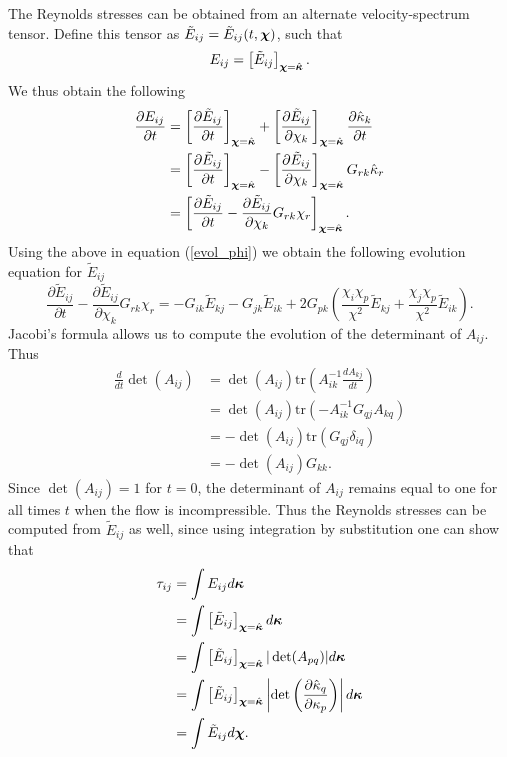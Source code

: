 \documentclass[oneside,a4paper,11pt]{report}
\newcommand{\rs}{\tau}          %
\newcommand{\est}{E}            %
\begin{document}
The Reynolds stresses can be obtained from an alternate velocity-spectrum tensor. Define this tensor as $\tilde{\est}_{ij} = \tilde{\est}_{ij}(t,\chivec)$, such that
\begin{equation}
\est_{ij} = \left [ \tilde{\est}_{ij} \right ]_{\chivec = \hat{\kvec}}.
\end{equation}
We thus obtain the following
\begin{align}
\frac{\partial{\est_{ij}}}{\partial t} &= \left [ \frac{ \partial \tilde{\est}_{ij} }{\partial t} \right ]_{\chivec = \hat{\kvec}} + \left [ \frac{\partial \tilde{\est}_{ij} }{\partial \chi_k} \right ]_{\chivec = \hat{\kvec} } \frac{\partial \hat{\kappa}_k }{\partial t} \nonumber \\
& = \left [ \frac{\partial \tilde{\est}_{ij} }{\partial t} \right ]_{\chivec = \hat{\kvec} } - \left [ \frac{\partial \tilde{\est}_{ij} }{\partial \chi_k} \right ]_{\chivec = \hat{\kvec} } G_{rk} \hat{\kappa}_r \nonumber \\
& = \left [ \frac{\partial \tilde{\est}_{ij}}{\partial t} - \frac{\partial \tilde{\est}_{ij}}{\partial \chi_k} G_{rk}\chi_r \right ]_{\chivec = \hat{\kvec} }.
\end{align}
Using the above in equation (\ref{evol_phi}) we obtain the following evolution equation for $\tilde{\est}_{ij}$
\begin{equation}
\frac{\partial \tilde{\est}_{ij}}{\partial t} - \frac{\partial \tilde{\est}_{ij}}{\partial \chi_k} G_{rk}\chi_r =
-G_{ik} \tilde{\est}_{kj} - G_{jk}\tilde{\est}_{ik} + 2 G_{pk} \left ( \frac{\chi_i \chi_p}{\chi^2} \tilde{\est}_{kj} + \frac{\chi_j \chi_p}{\chi^2} \tilde{\est}_{ik} \right ).
\end{equation}
Jacobi's formula allows us to compute the evolution of the determinant of $A_{ij}$. Thus
\begin{align}
\frac{d}{dt} \det(A_{ij}) & = \det(A_{ij}) \text{tr}\left( A^{-1}_{ik} \frac{d A_{kj}}{dt} \right ) \nonumber \\
& = \det(A_{ij}) \text{tr} ( -A^{-1}_{ik} G_{qj} A_{kq} ) \nonumber \\
& = -\det(A_{ij}) \text{tr} (G_{qj} \delta_{iq}) \nonumber \\
& = -\det(A_{ij}) G_{kk}.
\end{align}
Since $\det(A_{ij}) = 1$ for $t = 0$, the determinant of $A_{ij}$ remains equal to one for all times $t$ when the flow is incompressible. Thus the Reynolds stresses can be computed from $\tilde{\est}_{ij}$ as well, since using integration by substitution one can show that
\begin{align}
\rs_{ij} &= \int \est_{ij} d\kvec \nonumber \\
&= \int \left [ \tilde{\est}_{ij} \right ]_{\chivec = \hat{\kvec} } d\kvec \nonumber \\
&= \int \left [ \tilde{\est}_{ij} \right ]_{\chivec = \hat{\kvec}} | \det(A_{pq}) | d\kvec \nonumber \\
&= \int \left [ \tilde{\est}_{ij} \right ]_{\chivec = \hat{\kvec}} \left | \det \left (\frac{\partial \hat{\kappa}_q}{\partial \kappa_p} \right ) \right | d\kvec \nonumber \\
&= \int \tilde{\est}_{ij} d\chivec.
\end{align}
\end{document}
